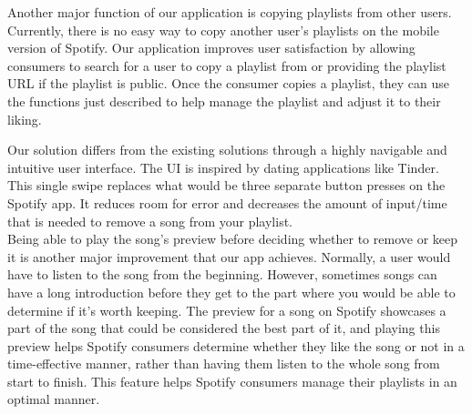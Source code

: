 \documentclass{article}
\begin{document}
\quad Another major function of our application is copying playlists from other users. Currently, there is no easy way to copy another user’s playlists on the mobile version of Spotify. Our application improves user satisfaction by allowing consumers to search for a user to copy a playlist from or providing the playlist URL if the playlist is public. Once the consumer copies a playlist, they can use the functions just described to help manage the playlist and adjust it to their liking.

\quad Our solution differs from the existing solutions through a highly navigable and intuitive user interface. The UI is inspired by dating applications like Tinder. This single swipe replaces what would be three separate button presses on the Spotify app.  It reduces room for error and decreases the amount of input/time that is needed to remove a song from your playlist.
\\

\quad Being able to play the song’s preview before deciding whether to remove or keep it is another major improvement that our app achieves. Normally, a user would have to listen to the song from the beginning. However, sometimes songs can have a long introduction before they get to the part where you would be able to determine if it’s worth keeping. The preview for a song on Spotify showcases a part of the song that could be considered the best part of it, and playing this preview helps Spotify consumers determine whether they like the song or not in a time-effective manner, rather than having them listen to the whole song from start to finish. This feature helps Spotify consumers manage their playlists in an optimal manner.
\\

\end{document}
